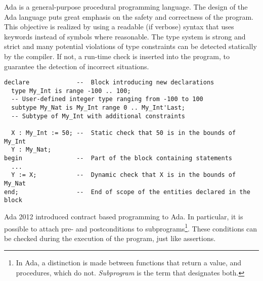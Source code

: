 \documentclass[runningheads]{llncs}
\begin{document}
Ada is a general-purpose procedural programming language. %
The design of the Ada language puts great emphasis on the safety and correctness of the program. This objective is realized by using a readable (if verbose) syntax that uses keywords instead of symbols where reasonable. The type system %
is strong and strict %
and many potential violations of type constraints can be detected statically by the compiler. If not, a run-time check is inserted into the program, to guarantee the detection of incorrect situations. %
\begin{lstlisting}
declare             --  Block introducing new declarations
  type My_Int is range -100 .. 100;
  -- User-defined integer type ranging from -100 to 100
  subtype My_Nat is My_Int range 0 .. My_Int'Last;
  -- Subtype of My_Int with additional constraints
  
  X : My_Int := 50; --  Static check that 50 is in the bounds of My_Int
  Y : My_Nat;
begin               --  Part of the block containing statements
  ...
  Y := X;           --  Dynamic check that X is in the bounds of My_Nat
end;                --  End of scope of the entities declared in the block
\end{lstlisting}
Ada 2012 %
introduced contract based programming to Ada. In particular, it is possible to attach pre- and postconditions to subprograms\footnote{In Ada, a distinction is made between functions that return a value, and procedures, which do not. \emph{Subprogram} is the term that designates both.}. %
These conditions can be checked during the execution of the program, just like assertions.
\end{document}
